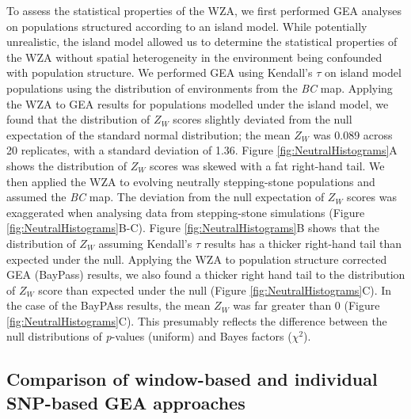 \documentclass[10pt,twoside,lineno]{GSA_format}
\begin{document}
To assess the statistical properties of the WZA, we first performed GEA analyses on populations structured according to an island model. While potentially unrealistic, the island model allowed us to determine the statistical properties of the WZA without spatial heterogeneity in the environment being confounded with population structure. We performed GEA using Kendall's $\tau$ on island model populations using the distribution of environments from the  \textit{BC} map. Applying the WZA to GEA results for populations modelled under the island model, we found that the distribution of $Z_W$ scores slightly deviated from the null expectation of the standard normal distribution; the mean $Z_W$ was 0.089 across 20 replicates, with a standard deviation of 1.36. Figure \ref{fig:NeutralHistograms}A shows the distribution of $Z_W$ scores was skewed with a fat right-hand tail. We then applied the WZA to evolving neutrally stepping-stone populations and assumed the \textit{BC} map. The deviation from the null expectation of $Z_W$ scores was exaggerated when analysing data from stepping-stone simulations (Figure \ref{fig:NeutralHistograms}B-C). Figure \ref{fig:NeutralHistograms}B shows that the distribution of $Z_W$ assuming Kendall's $\tau$ results has a thicker right-hand tail than expected under the null. Applying the WZA to population structure corrected GEA (BayPass) results, we also found a thicker right hand tail to the distribution of $Z_W$ score than expected under the null (Figure \ref{fig:NeutralHistograms}C). In the case of the BayPAss results, the mean $Z_W$ was far greater than 0 (Figure \ref{fig:NeutralHistograms}C). This presumably reflects the difference between the null distributions of \textit{p}-values (uniform) and Bayes factors ($\chi^2$).\\


\subsection{Comparison of window-based and individual SNP-based GEA approaches}
\end{document}
